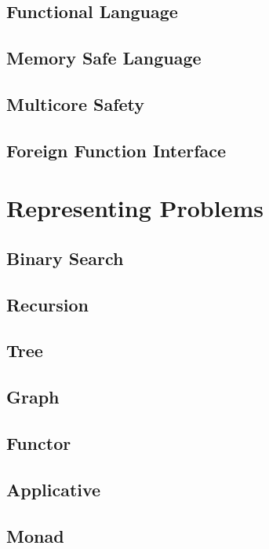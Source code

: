\documentclass{kdp}
\begin{document}
\chapter{Functional Language}

\chapter{Memory Safe Language}

\chapter{Multicore Safety}

\chapter{Foreign Function Interface}

\part{Representing Problems}

\chapter{Binary Search}

\chapter{Recursion}

\chapter{Tree}

\chapter{Graph}

\chapter{Functor}

\chapter{Applicative}

\chapter{Monad}
\end{document}
